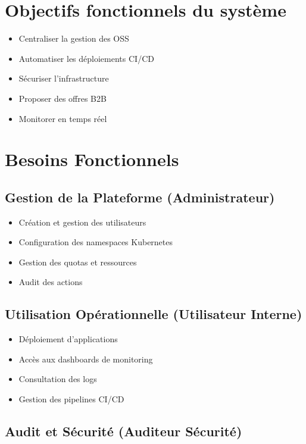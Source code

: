 \documentclass[12pt,a4paper,twoside]{report}
\begin{document}
\section{Objectifs fonctionnels du système}

\begin{itemize}
    \item Centraliser la gestion des OSS
    \item Automatiser les déploiements CI/CD
    \item Sécuriser l'infrastructure
    \item Proposer des offres B2B
    \item Monitorer en temps réel
\end{itemize}

\section{Besoins Fonctionnels}

\subsection{Gestion de la Plateforme (Administrateur)}

\begin{itemize}
    \item Création et gestion des utilisateurs
    \item Configuration des namespaces Kubernetes
    \item Gestion des quotas et ressources
    \item Audit des actions
\end{itemize}

\subsection{Utilisation Opérationnelle (Utilisateur Interne)}

\begin{itemize}
    \item Déploiement d'applications
    \item Accès aux dashboards de monitoring
    \item Consultation des logs
    \item Gestion des pipelines CI/CD
\end{itemize}

\subsection{Audit et Sécurité (Auditeur Sécurité)}
\end{document}
